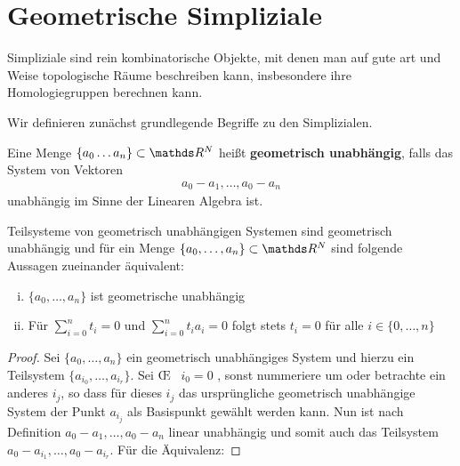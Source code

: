 





\section{Geometrische Simpliziale}

Simpliziale sind rein kombinatorische Objekte, mit denen man auf gute
art und Weise topologische Räume beschreiben kann, insbesondere ihre
Homologiegruppen berechnen kann.

Wir definieren zunächst grundlegende Begriffe zu den Simplizialen.

\begin{Def}
  Eine Menge $\{ a_0\ldots a_n \} \subset \R^N$ heißt \textbf{geometrisch %
  unabhängig}, falls das System von Vektoren
  \begin{gather*}
    a_0 - a_1 , \ldots , a_0 - a_n
  \end{gather*}
  unabhängig im Sinne der Linearen Algebra ist.
\end{Def}

\begin{Lem}
  Teilsysteme von geometrisch unabhängigen Systemen sind geometrisch
  unabhängig und für ein Menge $\{ a_0 , \ldots , a_n \} \subset \R^N$ sind folgende Aussagen zueinander äquivalent:
  \begin{enumerate}[i)]
  	\item $\{ a_0 , \ldots , a_n \}$ ist geometrische unabhängig
  	\item Für $\sum\limits_{i=0}^n t_i = 0$ und $\sum\limits_{i=0}^n t_i a_i = 0$ folgt stets $t_i = 0$ für alle $i \in \{ 0,\ldots,n\}$
  \end{enumerate}
  \begin{proof}
    Sei $\{ a_0 , \ldots , a_n \}$ ein geometrisch unabhängiges System und hierzu 
    ein Teilsystem $\{ a_{i_0},\ldots,a_{i_r} \}$. 
    Sei \OE~ $i_0 = 0$ , sonst nummeriere um oder betrachte ein anderes $i_j$, so dass für dieses $i_j$ das ursprüngliche geometrisch unabhängige System der Punkt $a_{i_j}$ als Basispunkt gewählt werden kann. Nun ist nach Definition $ a_0 - a_1 , \ldots , a_0 - a_n$ linear unabhängig und somit auch das Teilsystem $ a_0 - a_ {i_1}, \ldots , a_0 - a_{i_r}$.
    Für die Äquivalenz:
  \end{proof}
\end{Lem}

